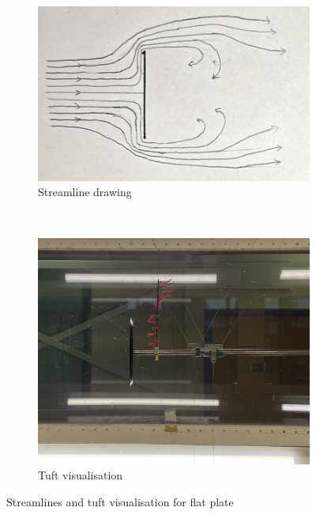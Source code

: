 \documentclass[8pt]{article}
\begin{document}
\begin{figure}[H]
    \centering
    \begin{subfigure}[t]{0.48\textwidth}
        \centering
        \includegraphics[width=1\textwidth]{Images_Videos/stream_flat_plate_1.jpg}
        \caption{Streamline drawing}
        \label{fig:figure4}
    \end{subfigure}
    ~
    \begin{subfigure}[t]{0.48\textwidth}
        \centering
        \includegraphics[width=1\textwidth]{Images_Videos/Plate_8milibar_cropped.jpg}
        \caption{Tuft visualisation}
        \label{fig:figure5}
    \end{subfigure}
    \caption{Streamlines and tuft visualisation for flat plate}
\end{figure}
\end{document}
